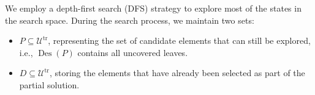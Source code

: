 \documentclass[11pt,a4paper]{article} \usepackage{enumitem}
\newcommand{\calU}{\mathcal{U}}
\newcommand{\LBOtreecov}{\textsf{LogBgt-TreeCov}}
\newcommand{\trU}{\operatorname{\calU^{tr}}}
\newcommand{\trS}[1]{\ifx\relax#1\relax
    S^{\operatorname{tr}} \else
    S^{\operatorname{tr}}_{#1} \fi
}
\newcommand{\Des}{\operatorname{Des}}
\theoremstyle{definition}
\newcommand{\jian}[1]{{\it \color{red}{Jian: #1}}}
\newcommand{\ckw}[1]{}
\newcommand{\zyr}[1]{{\it \color{blue}{zyr: #1}}}
\begin{document}
\begin{comment}
\color{blue}
The goal of the algorithm is to identify a partial solution, which is a subset of $S = \trS{1} \cup \cdots \cup \trS{T_0}$, that "almost covers" an optimal solution. This partial solution can then be extended into a complete solution that provides a constant-factor approximation for the \LBOtreecov\ problem.

\jian{is this the partial enumeration?
the goal is to list a set of partial solution 
instead of identify one?? confusing.}

To begin, we assume that every element $u$ in the partial solution satisfies $C_2(u) \geq \frac{1}{\log n}$. This assumption holds because any such $u$ can be replaced 
\jian{this doesn't make any sense since the reader has no idea what C1 C2 are and what you want to achieve. stop reading.}
by other elements whose total $C_1$ cost is at most $C_2(u)$. Since $\frac{1}{2^{T_0}} > \frac{1}{\log n}$, the replacement elements belong to groups with indices greater than $T_0$. For a $c_0$-valid solution, the total number of elements in the partial solution is bounded by
$c_0 \cdot \left(2^1 + 2^2 + \cdots + 2^{T_0}\right) \leq 2^{T_0+1} c_0.$
As a result, replacing these elements increases the total additional $C_1$ cost in each group by at most $c_0$, resulting in a cost increase by a factor of at most 2.

Then, by assuming each $C_2(u)>\frac{1}{\log n}$ in the partial solution, we list all possible partial solutions from group $\trS{1}$ to $\trS{T_0}$.
In step $i$, we consider all remaining nodes in group $i$. By definition, no one is another's ancestor.
If a $c_0$-valid solution exists, the total number of choices is at most $c_0\log^2 n\cdot 2^i$ (because the total sum of $C_2$ values is at most $T$), and we need to choose at most $2c_0\cdot 2^i$ elements.
After the choice, we delete the subtree under all chosen elements and move to the next $i$.
It can be shown that the total number of choices is polynomial in $n$.
\color{black}
\zyr{modified}

\jian{why only consider boundary cases? what is the normal case??}

\ckw{it is my version and I removed all the previous paragraph:}
\end{comment}

We employ a depth-first search (DFS) strategy to explore most of the states in the search space. During the search process, we maintain two sets:
\begin{itemize}
    \item \( P\subseteq \trU \), representing the set of candidate elements that can still be explored, i.e., \( \Des(P) \) contains all uncovered leaves.
    \item \( D\subseteq \trU \), storing the elements that have already been selected as part of the partial solution.
\end{itemize}
\end{document}
